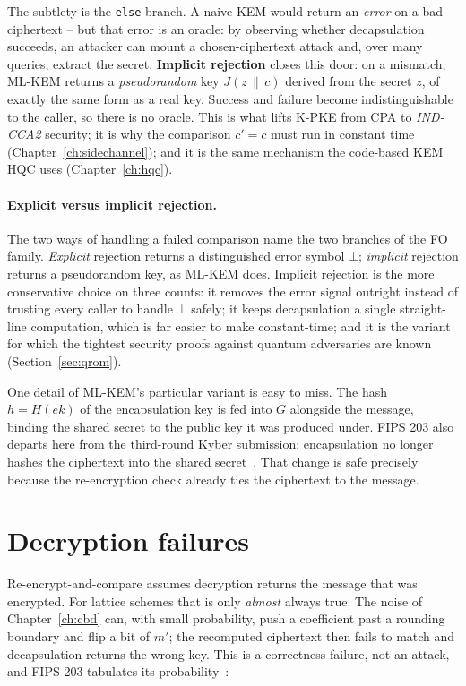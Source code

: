 The subtlety is the \texttt{else} branch. A naive KEM would return an \emph{error} on a bad ciphertext -- but that error is an oracle: by observing whether decapsulation succeeds, an attacker can mount a chosen-ciphertext attack and, over many queries, extract the secret. \textbf{Implicit rejection} closes this door: on a mismatch, ML-KEM returns a \emph{pseudorandom} key $J(z\,\|\,c)$ derived from the secret $z$, of exactly the same form as a real key. Success and failure become indistinguishable to the caller, so there is no oracle. This is what lifts K-PKE from CPA to \emph{IND-CCA2} security; it is why the comparison $c'=c$ must run in constant time (Chapter~\ref{ch:sidechannel}); and it is the same mechanism the code-based KEM HQC uses (Chapter~\ref{ch:hqc}).

\paragraph{Explicit versus implicit rejection.}
The two ways of handling a failed comparison name the two branches of the FO
family. \emph{Explicit} rejection returns a distinguished error symbol $\bot$;
\emph{implicit} rejection returns a pseudorandom key, as ML-KEM does. Implicit
rejection is the more conservative choice on three counts: it removes the error
signal outright instead of trusting every caller to handle $\bot$ safely; it
keeps decapsulation a single straight-line computation, which is far easier to
make constant-time; and it is the variant for which the tightest security proofs
against quantum adversaries are known (Section~\ref{sec:qrom}).

One detail of ML-KEM's particular variant is easy to miss. The hash $h = H(ek)$
of the encapsulation key is fed into $G$ alongside the message, binding the
shared secret to the public key it was produced under. FIPS 203 also departs
here from the third-round Kyber submission: encapsulation no longer hashes the
ciphertext into the shared secret~\cite{fips203}. That change is safe precisely
because the re-encryption check already ties the ciphertext to the message.

\section{Decryption failures}

Re-encrypt-and-compare assumes decryption returns the message that was
encrypted. For lattice schemes that is only \emph{almost} always true. The noise
of Chapter~\ref{ch:cbd} can, with small probability, push a coefficient past a
rounding boundary and flip a bit of $m'$; the recomputed ciphertext then fails to
match and decapsulation returns the wrong key. This is a correctness failure,
not an attack, and FIPS 203 tabulates its probability~\cite{fips203}:


